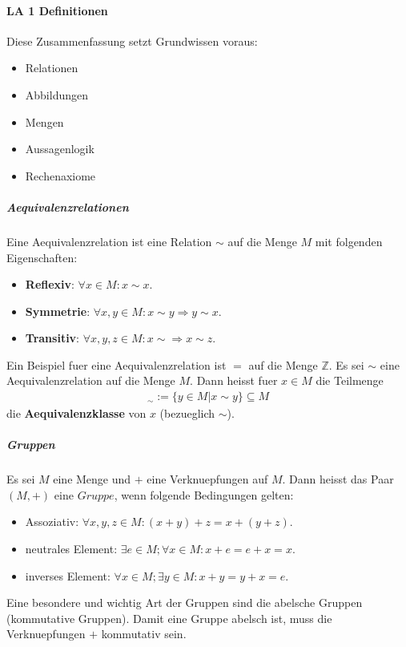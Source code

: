 \documentclass[12pt]{article}
\begin{document}
\paragraph{\Large LA 1 Definitionen}
\begin{flushleft}
    Diese Zusammenfassung setzt Grundwissen voraus:
    \begin{itemize}
        \item Relationen
        \item Abbildungen
        \item Mengen
        \item Aussagenlogik
        \item Rechenaxiome
    \end{itemize}
\end{flushleft}
\vspace{0.5cm}
\subparagraph{\large Aequivalenzrelationen}
\normalsize
\begin{flushleft}
    Eine Aequivalenzrelation ist eine Relation $\sim$ auf die Menge $M$ mit folgenden Eigenschaften:
    \begin{itemize}
        \item \textbf{Reflexiv}: $\forall x \in M: x \sim x$.
        \item \textbf{Symmetrie}: $\forall x,y \in M: x \sim y \Rightarrow y \sim x$.
        \item \textbf{Transitiv}: $\forall x,y,z \in M: x \sim \Rightarrow x \sim z$.
    \end{itemize}
    Ein Beispiel fuer eine Aequivalenzrelation ist $=$ auf die Menge $\mathbb{Z}$.
    \vspace{1cm}
    Es sei $\sim$ eine Aequivalenzrelation auf die Menge $M$. Dann heisst fuer $x \in M$ die Teilmenge
    \begin{align*}
        [x]_{\sim} := \{y \in M | x \sim y\} \subseteq M
    \end{align*}
    die \textbf{Aequivalenzklasse} von $x$ (bezueglich $\sim$).
\end{flushleft}
\vspace{1cm}
\subparagraph{\large Gruppen}
\normalsize
\begin{flushleft}
    Es sei $M$ eine Menge und $+$ eine Verknuepfungen auf $M$. Dann heisst das Paar $(M,+)$ eine $Gruppe$, wenn folgende Bedingungen gelten:
    \begin{itemize}
        \item Assoziativ: $\forall x,y,z \in M: (x + y) + z = x + (y + z)$.
        \item neutrales Element: $\exists e \in M; \forall x \in M: x + e = e + x = x$.
        \item inverses Element: $\forall x \in M; \exists y \in M: x + y = y + x = e$.
    \end{itemize}
    Eine besondere und wichtig Art der Gruppen sind die abelsche Gruppen (kommutative Gruppen).
    Damit eine Gruppe abelsch ist, muss die Verknuepfungen $+$ kommutativ sein.
\end{flushleft}
\end{document}
